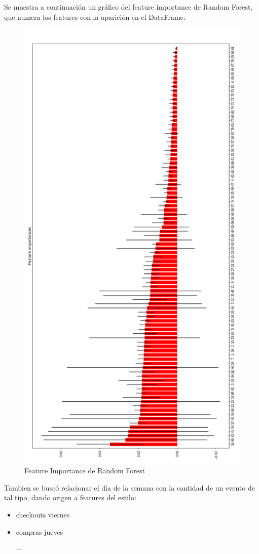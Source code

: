 \documentclass[a4paper ,12pt]{article}
\begin{document}
Se muestra a continuación un gráfico del feature importance de Random Forest, que numera los features con la aparición en el DataFrame:

\begin{figure}
\centering
\includegraphics[width=0.8\linewidth,  height=0.9\textheight]{feature-RF}
\caption{Feature Importance de Random Forest}
\label{fig:feature-RF}
\end{figure}
	
Tambien se buscó relacionar el día de la semana con la cantidad de un evento de tal tipo, dando origen a features del estilo:

	\begin{itemize}
		\item 	checkouts viernes
		
		\item compras jueves
		
		$\cdots$
	\end{itemize}	
\end{document}
